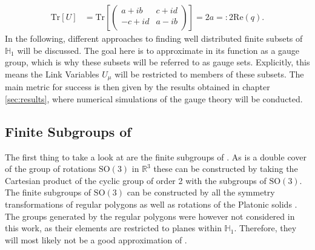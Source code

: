 \begin{align*}
 \mathrm{Tr}\left[ U \right] & = \mathrm{Tr}\left[ \begin{pmatrix}
   a + ib  & c + id \\
   -c + id & a - ib \\
  \end{pmatrix} \right] = 2 a = : 2 \mathrm{Re} (q) \textrm{.}
\end{align*}
In the following, different approaches to finding well distributed finite subsets of $\mathbb{H}_1$ will be discussed. The goal here is to approximate \SUTwo in its function as a gauge group, which is why these subsets will be referred to as gauge sets. Explicitly, this means the Link Variables $U_\mu$ will be restricted to members of these subsets. The main metric for success is then given by the results obtained in chapter \ref{sec:results}, where numerical simulations of the gauge theory will be conducted.

\subsection{Finite Subgroups of \SUTwo}

The first thing to take a look at are the finite subgroups of \SUTwo. As \SUTwo is a double cover of the group of rotations $\mathrm{SO(3)}$ in $\mathbb{R}^3$ these can be constructed by taking the Cartesian product of the cyclic group of order 2 with the subgroups of $\mathrm{SO}(3)$. The finite subgroups of $\mathrm{SO}(3)$ can be constructed by all the symmetry transformations of regular polygons as well as rotations of the Platonic solids \cite{Klein:1880}. The groups generated by the regular polygons were however not considered in this work, as their elements are restricted to planes within $\mathbb{H}_1$. Therefore, they will most likely not be a good approximation of \SUTwo.\\

